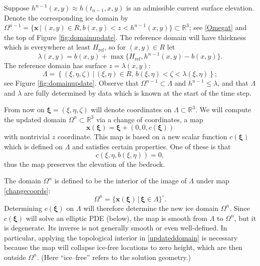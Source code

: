 \documentclass[letterpaper,final,12pt,reqno]{amsart}
\newcommand{\RR}{\mathbb{R}}
\newcommand{\bx}{\mathbf{x}}
\newcommand{\bxi}{\bm{\xi}}
\newcommand{\Href}{H_{\text{ref}}}
\begin{document}
Suppose $h^{n-1}(x,y) \approx h(t_{n-1},x,y)$ is an admissible current surface elevation.  Denote the corresponding ice domain by $\Omega^{n-1}=\{\bx\,\big|\,(x,y)\in R, b(x,y)<z<h^{n-1}(x,y)\} \subset \RR^3$; see \eqref{Omegat} and the top of Figure \ref{fig:domainupdate}.  The reference domain will have thickness which is everywhere at least $\Href$, so for $(x,y) \in R$ let
\begin{equation}
\lambda(x,y) = b(x,y) + \max\{\Href,h^{n-1}(x,y)-b(x,y)\}. \label{definelambda}
\end{equation}
The reference domain has surface $z=\lambda(x,y)$:
\begin{equation}
\Lambda = \left\{(\xi,\eta,\zeta)\,\big|\,(\xi,\eta)\in R, \, b(\xi,\eta) < \zeta < \lambda(\xi,\eta)\right\};  \label{Lambda}
\end{equation}
see Figure \ref{fig:domainupdate}.  Observe that $\Omega^{n-1} \subset \Lambda$ and $h^{n-1} \le \lambda$, and that $\Lambda$ and $\lambda$ are fully determined by data which is known at the start of the time step.

From now on $\bxi=(\xi,\eta,\zeta)$ will denote coordinates on $\Lambda \subset \RR^3$.  We will compute the updated domain $\Omega^n \subset \RR^3$ via a change of coordinates, a map
\begin{equation}
\bx(\bxi) = \bxi + (0,0,c(\bxi)) \label{changecoords}
\end{equation}
with nontrivial $z$ coordinate.  This map is based on a new scalar function $c(\bxi)$ which is defined on $\Lambda$ and satisfies certain properties.  One of these is that
\begin{equation}
c(\xi,\eta,b(\xi,\eta))=0, \label{mapbasetobase}
\end{equation}
thus the map preserves the elevation of the bedrock.

The domain $\Omega^n$ is defined to be the interior of the image of $\Lambda$ under map \eqref{changecoords}:
\begin{equation}
\Omega^n = \{\bx(\bxi) \,\big|\, \bxi \in \Lambda\}^\circ. \label{updateddomain}
\end{equation}
Determining $c(\bxi)$ on $\Lambda$ will therefore determine the new ice domain $\Omega^n$.  Since $c(\bxi)$ will solve an elliptic PDE (below), the map is smooth from $\Lambda$ to $\Omega^n$, but it is degenerate.  Its inverse is not generally smooth or even well-defined.  In particular, applying the topological interior in \eqref{updateddomain} is necessary because the map will collapse ice-free locations to zero height, which are then outside $\Omega^n$.  (Here ``ice--free'' refers to the solution geometry.)
\end{document}
